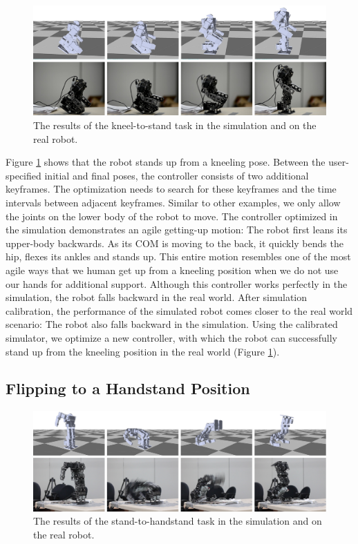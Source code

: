 \begin{figure}[!t]
  \centering
  \includegraphics[width=\textwidth]{figures/kneel2Stand}
  \caption{The results of the kneel-to-stand task in the simulation and on the real robot.}
  \label{fig:kneel2Stand}
\end{figure}

Figure \ref{fig:kneel2Stand} shows that the robot stands up from a kneeling pose. Between the user-specified initial and final poses, the controller consists of two additional keyframes. The optimization needs to search for these keyframes and the time intervals between adjacent keyframes. Similar to other examples, we only allow the joints on the lower body of the robot to move. The controller optimized in the simulation demonstrates an agile getting-up motion: The robot first leans its upper-body backwards. As its COM is moving to the back, it quickly bends the hip, flexes its ankles and stands up. This entire motion resembles one of the most agile ways that we human get up from a kneeling position when we do not use our hands for additional support. Although this controller works perfectly in the simulation, the robot falls backward in the real world. After simulation calibration, the performance of the simulated robot comes closer to the real world scenario: The robot also falls backward in the simulation. Using the calibrated simulator, we optimize a new controller, with which the robot can successfully stand up from the kneeling position in the real world (Figure \ref{fig:kneel2Stand}).


\subsection{Flipping to a Handstand Position}


\begin{figure}[!t]
  \centering
  \includegraphics[width=\textwidth]{figures/stand2Hand}
  \caption{The results of the stand-to-handstand task in the simulation and on the real robot.}
  \label{fig:stand2Hand}
\end{figure}

